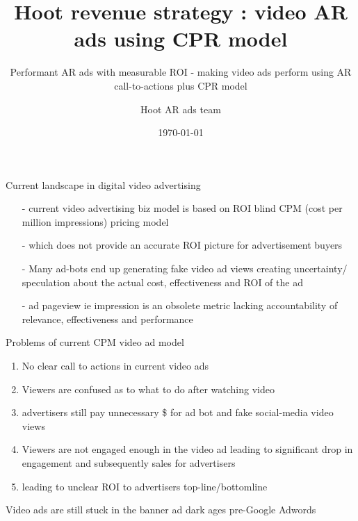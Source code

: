 \documentclass[11pt]{beamer}
\title{ Hoot revenue strategy : video AR ads using CPR model}
\subtitle{Performant AR ads with measurable ROI  - making video ads perform using AR call-to-actions plus CPR model}
\date{\today}
\author{Hoot AR ads team}
\institute{Hoot Live inc., a Delaware C-corp}
\begin{document}
\maketitle



\begin{frame}[fragile]{Current landscape in digital video advertising}
  \begin{itemize}[<+-| alert@+>]%
	  
\item[-]current video advertising biz model is based on ROI blind CPM (cost per million impressions) pricing model
\item[-]which does not provide an accurate ROI picture for advertisement buyers
\item[-]Many ad-bots end up generating fake video ad views creating uncertainty/ speculation about the actual cost, effectiveness and ROI of the ad
\item[-]ad pageview ie impression is an obsolete metric lacking accountability of relevance, effectiveness and performance 
\end{itemize}

\end{frame}
\begin{frame}[t]{Problems of current CPM video ad model}
\begin{enumerate}[<+-| alert@+>]
\item No clear call to actions in current video ads
\item Viewers are confused as to what to do after watching video
\item advertisers still pay unnecessary \$ for ad bot  and fake social-media video views
\item Viewers are not engaged enough in the video ad leading to  significant drop in engagement and subsequently sales for advertisers
\item leading to unclear ROI to advertisers top-line/bottomline
\end{enumerate}
\pause
Video ads are still stuck in the banner ad dark ages pre-Google Adwords

\end{frame}
\end{document}
